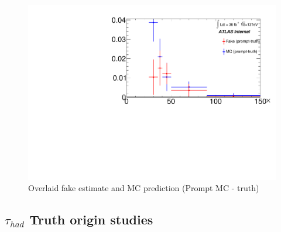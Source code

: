 \documentclass[11pt]{article}
\begin{document}
	\begin{figure}[H]
		\centering
		\includegraphics[width=0.7\linewidth]{figures/FakesEstimate_data_pp8_nonallhad_new_scaledHists/Overlay_FF_tau_pt_prompt-truth.pdf}
		\caption{Overlaid fake estimate and MC prediction (Prompt MC - truth)}
	\end{figure}		
			
			
	\subsection{$\tau_{had}$ Truth origin studies} 	
			
\end{document}
